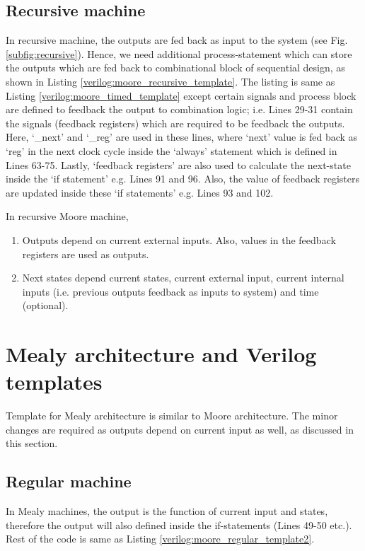 \subsection{Recursive machine}
In recursive machine, the outputs are fed back as input to the system (see Fig. \ref{subfig:recursive}). Hence, we need additional process-statement which can store the outputs which are fed back to combinational block of sequential design, as shown in Listing \ref{verilog:moore_recursive_template}. The listing is same as Listing \ref{verilog:moore_timed_template} except certain signals and process block are defined to feedback the output to combination logic; i.e. Lines 29-31 contain the signals (feedback registers) which are required to be feedback the outputs. Here, `\_next' and `\_reg' are used in these lines, where `next' value is fed back as `reg' in the next clock cycle inside the `always' statement which is defined in Lines 63-75. Lastly, `feedback registers' are also used to calculate the next-state inside the `if statement' e.g. Lines 91 and 96. Also, the value of feedback registers are updated inside these `if statements' e.g. Lines 93 and 102. 

\begin{noNumBox}
	In recursive Moore machine, 
	\begin{enumerate}
		\item Outputs depend on current external inputs. Also, values in the feedback registers are used as outputs.
		\item Next states depend current states, current external input, current internal inputs (i.e. previous outputs feedback as inputs to system) and time (optional).
	\end{enumerate}
\end{noNumBox}




\section{Mealy architecture and Verilog templates} \label{sec:MealyTemplates}
Template for Mealy architecture is similar to Moore architecture. The minor changes are required as outputs depend on current input as well, as discussed in this section.
\subsection{Regular machine}
In Mealy machines, the output is the function of current input and states, therefore the output will also defined inside the if-statements (Lines 49-50 etc.). Rest of the code is same as Listing \ref{verilog:moore_regular_template2}. 



